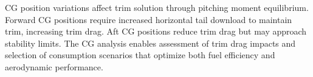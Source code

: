 CG position variations affect trim solution through pitching moment equilibrium. Forward CG positions require increased horizontal tail download to maintain trim, increasing trim drag. Aft CG positions reduce trim drag but may approach stability limits. The CG analysis enables assessment of trim drag impacts and selection of consumption scenarios that optimize both fuel efficiency and aerodynamic performance.
